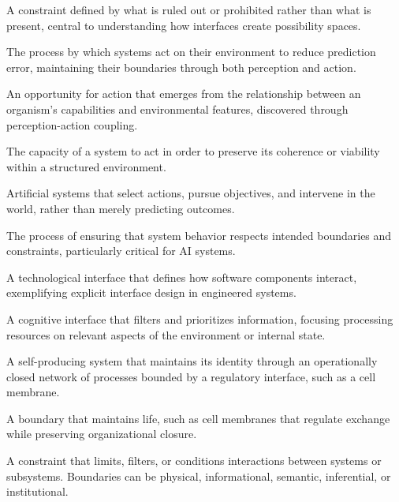 \documentclass[
  openright]{book}
\renewenvironment{description}
  {\list{}{\labelwidth 0pt \itemindent-\leftmargin \leftmargin 2.5em
          \itemsep 0.4\baselineskip
          \parsep 0pt
          \let\makelabel\descriptionlabel}}
  {\endlist}
\newcommand*\descriptionlabel[1]{\hspace\labelsep\normalfont\bfseries #1}
\begin{document}
\vspace{0.5\baselineskip}
\begin{description}
\item[Absence] A constraint defined by what is ruled out or prohibited rather than what is present, central to understanding how interfaces create possibility spaces.

\item[Active Inference] The process by which systems act on their environment to reduce prediction error, maintaining their boundaries through both perception and action.

\item[Affordance] An opportunity for action that emerges from the relationship between an organism's capabilities and environmental features, discovered through perception-action coupling.

\item[Agency] The capacity of a system to act in order to preserve its coherence or viability within a structured environment.

\item[Agentic AI] Artificial systems that select actions, pursue objectives, and intervene in the world, rather than merely predicting outcomes.

\item[Alignment] The process of ensuring that system behavior respects intended boundaries and constraints, particularly critical for AI systems.

\item[API (Application Programming Interface)] A technological interface that defines how software components interact, exemplifying explicit interface design in engineered systems.

\item[Attention Mechanism] A cognitive interface that filters and prioritizes information, focusing processing resources on relevant aspects of the environment or internal state.

\item[Autopoiesis] A self-producing system that maintains its identity through an operationally closed network of processes bounded by a regulatory interface, such as a cell membrane.

\item[Biological Interface] A boundary that maintains life, such as cell membranes that regulate exchange while preserving organizational closure.

\item[Boundary] A constraint that limits, filters, or conditions interactions between systems or subsystems. Boundaries can be physical, informational, semantic, inferential, or institutional.


\end{description}
\end{document}
